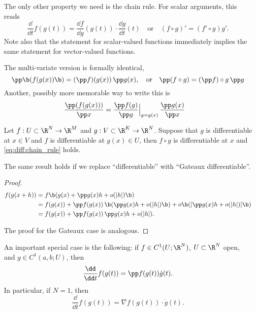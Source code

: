 The only other property we need is the chain rule. For scalar arguments, this reads
\begin{displaymath}
  \frac{\dd}{\dd t} f(g(t)) = \frac{\dd f}{\dd g} (g(t)) \cdot
  \frac{\dd g}{\dd t}(t) \quad \text{or} \quad
  (f \circ g)' = (f' \circ g) g'.
\end{displaymath}
Note also that the statement for scalar-valued functions immediately
implies the same statement for vector-valued functions.

The multi-variate version is formally identical,
\begin{equation}
  \label{eq:diff:chain_rule}
  \pp \b( f(g(x)) \b) = (\pp f)(g(x)) \, \pp g(x), \quad \text{or}
  \quad
  \pp(f \circ g) = (\pp f) \circ g \, \pp g
\end{equation}
Another, possibly more memorable way to write this is
\begin{align*}
  \frac{\pp (f(g(x)))}{\pp x} &= \frac{\pp f(g)}{\pp g}\Big|_{g = g(x)} \,
  \frac{\pp g(x)}{\pp x}
\end{align*}

\begin{proposition}
  Let $f : U \subset \R^N \to \R^M$ and $g : V \subset \R^K \to
  \R^N$. Suppose that $g$ is differentiable at $x \in V$ and $f$ is
  differentiable at $g(x) \in U$, then $f \circ g$ is differentiable
  at $x$ and \eqref{eq:diff:chain_rule} holds.

  The same result holds if we replace ``differentiable'' with
  ``Gateaux differentiable''.
\end{proposition}
\begin{proof}
  \begin{align*}
    f(g(x+h)) &= f\b( g(x) + \pp g(x) h + o(|h|) \b) \\
    &= f(g(x)) + \pp f(g(x)) \, \b(\pp g(x) h + o(|h|)\b)
    + o\b( |\pp g(x) h + o(|h|)| \b) \\
    &= f(g(x)) + \pp f(g(x)) \, \pp g(x) h  + o(|h|).
  \end{align*}

  The proof for the Gateaux case is analogous.
\end{proof}

An important special case is the following: if $f \in C^1(U;\R^N)$, $U
\subset \R^N$ open, and $g \in C^1(a, b; U)$, then
\begin{displaymath}
  \frac{\dd}{\dd t} f(g(t)) = \pp f(g(t)) \dot{g}(t).
\end{displaymath}
In particular, if $N = 1$, then
\begin{displaymath}
  \label{eq:chain_rule_nabla}
  \frac{\dd}{\dd t} f(g(t)) =  \nabla f(g(t)) \cdot \dot{g}(t).
\end{displaymath}


